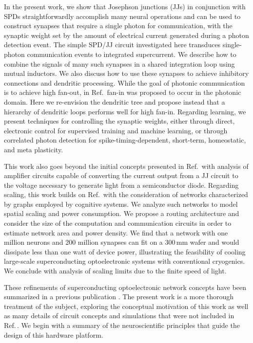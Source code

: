 \documentclass[aip,amsmath,amssymb,reprint,nofootinbib]{revtex4-1}
\begin{document}
In the present work, we show that Josephson junctions (JJs) in conjunction with SPDs straightforwardly accomplish many neural operations and can be used to construct synapses that require a single photon for communication, with the synaptic weight set by the amount of electrical current generated during a photon detection event. The simple SPD/JJ circuit investigated here transduces single-photon communication events to integrated supercurrent. We describe how to combine the signals of many such synapses in a shared integration loop using mutual inductors. We also discuss how to use these synapses to achieve inhibitory connections and dendritic processing. While the goal of photonic communication is to achieve high fan-out, in Ref.\, fan-in was proposed to occur in the photonic domain. Here we re-envision the dendritic tree and propose instead that a hierarchy of dendritic loops performs well for high fan-in. Regarding learning, we present techniques for controlling the synaptic weights, either through direct, electronic control for supervised training and machine learning, or through correlated photon detection for spike-timing-dependent, short-term, homeostatic, and meta plasticity. 

This work also goes beyond the initial concepts presented in Ref.\, with analysis of amplifier circuits capable of converting the current output from a JJ circuit to the voltage necessary to generate light from a semiconductor diode. Regarding scaling, this work builds on Ref.\, with the consideration of networks characterized by graphs employed by cognitive systems. We analyze such networks to model spatial scaling and power consumption. We propose a routing architecture and consider the size of the computation and communication circuits in order to estimate network area and power density. We find that a network with one million neurons and 200 million synapses can fit on a 300\,mm wafer and would dissipate less than one watt of device power, illustrating the feasibility of cooling large-scale superconducting optoelectronic systems with conventional cryogenics. We conclude with analysis of scaling limits due to the finite speed of light.

These refinements of superconducting optoelectronic network concepts have been summarized in a previous publication \cite{sh2018}. The present work is a more thorough treatment of the subject, exploring the conceptual motivation of this work as well as many details of circuit concepts and simulations that were not included in Ref.\,. We begin with a summary of the neuroscientific principles that guide the design of this hardware platform.
\end{document}
